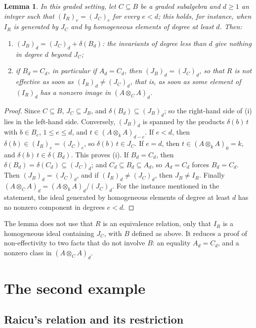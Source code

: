 \documentclass[11pt,a4paper]{amsart}
\newtheorem{lemma}[theorem]{Lemma}
\theoremstyle{remark}
\begin{document}
\begin{lemma}\label{lem:general}
In this graded setting, let $C \subseteq B$ be a graded subalgebra and $d \ge 1$ an integer such that $(I_R)_e = (J_C)_e$ for every $e < d$; this holds, for instance, when $I_R$ is generated by $J_C$ and by homogeneous elements of degree at least $d$. Then:
\begin{enumerate}
\item $(J_B)_d = (J_C)_d + \delta(B_d)$: the invariants of degree less than $d$ give nothing in degree $d$ beyond $J_C$;
\item if $B_d = C_d$, in particular if $A_d = C_d$, then $(J_B)_d = (J_C)_d$, so that $R$ is not effective as soon as $(I_R)_d \ne (J_C)_d$, that is, as soon as some element of $(I_R)_d$ has a nonzero image in $(A \otimes_C A)_d$.
\end{enumerate}
\end{lemma}

\begin{proof}
Since $C \subseteq B$, $J_C \subseteq J_B$, and $\delta(B_d) \subseteq (J_B)_d$; so the right-hand side of (i) lies in the left-hand side. Conversely, $(J_B)_d$ is spanned by the products $\delta(b)\,t$ with $b \in B_e$, $1 \le e \le d$, and $t \in (A \otimes_k A)_{d-e}$. If $e < d$, then $\delta(b) \in (I_R)_e = (J_C)_e$, so $\delta(b)\,t \in J_C$. If $e = d$, then $t \in (A \otimes_k A)_0 = k$, and $\delta(b)\,t \in \delta(B_d)$. This proves (i). If $B_d = C_d$, then $\delta(B_d) = \delta(C_d) \subseteq (J_C)_d$; and $C_d \subseteq B_d \subseteq A_d$, so $A_d = C_d$ forces $B_d = C_d$. Then $(J_B)_d = (J_C)_d$, and if $(I_R)_d \ne (J_C)_d$, then $J_B \ne I_R$. Finally $(A \otimes_C A)_d = (A \otimes_k A)_d/(J_C)_d$. For the instance mentioned in the statement, the ideal generated by homogeneous elements of degree at least $d$ has no nonzero component in degrees $e < d$.
\end{proof}

The lemma does not use that $R$ is an equivalence relation, only that $I_R$ is a homogeneous ideal containing $J_C$, with $B$ defined as above. It reduces a proof of non-effectivity to two facts that do not involve $B$: an equality $A_d = C_d$, and a nonzero class in $(A \otimes_C A)_d$.

\section{The second example}\label{sec:second}

\subsection{Raicu's relation and its restriction}
\end{document}
